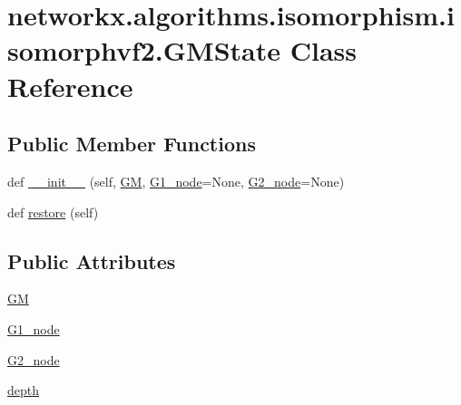 \hypertarget{classnetworkx_1_1algorithms_1_1isomorphism_1_1isomorphvf2_1_1GMState}{}\section{networkx.\+algorithms.\+isomorphism.\+isomorphvf2.\+G\+M\+State Class Reference}
\label{classnetworkx_1_1algorithms_1_1isomorphism_1_1isomorphvf2_1_1GMState}
\subsection*{Public Member Functions}
\begin{DoxyCompactItemize}
\item 
def \hyperlink{classnetworkx_1_1algorithms_1_1isomorphism_1_1isomorphvf2_1_1GMState_ac017518ec50f589c26e6937958702e3b}{\+\_\+\+\_\+init\+\_\+\+\_\+} (self, \hyperlink{classnetworkx_1_1algorithms_1_1isomorphism_1_1isomorphvf2_1_1GMState_ac2fd070bab70da3a84116232e2df57b0}{GM}, \hyperlink{classnetworkx_1_1algorithms_1_1isomorphism_1_1isomorphvf2_1_1GMState_af05bc658c5dc972849dd097568f8d4ec}{G1\+\_\+node}=None, \hyperlink{classnetworkx_1_1algorithms_1_1isomorphism_1_1isomorphvf2_1_1GMState_abe49d09ea5600e34acd1442061c3c211}{G2\+\_\+node}=None)
\item 
def \hyperlink{classnetworkx_1_1algorithms_1_1isomorphism_1_1isomorphvf2_1_1GMState_aa37d621b7a8e928174e9e7f00f10186b}{restore} (self)
\end{DoxyCompactItemize}
\subsection*{Public Attributes}
\begin{DoxyCompactItemize}
\item 
\hyperlink{classnetworkx_1_1algorithms_1_1isomorphism_1_1isomorphvf2_1_1GMState_ac2fd070bab70da3a84116232e2df57b0}{GM}
\item 
\hyperlink{classnetworkx_1_1algorithms_1_1isomorphism_1_1isomorphvf2_1_1GMState_af05bc658c5dc972849dd097568f8d4ec}{G1\+\_\+node}
\item 
\hyperlink{classnetworkx_1_1algorithms_1_1isomorphism_1_1isomorphvf2_1_1GMState_abe49d09ea5600e34acd1442061c3c211}{G2\+\_\+node}
\item 
\hyperlink{classnetworkx_1_1algorithms_1_1isomorphism_1_1isomorphvf2_1_1GMState_a8996f598119f57ac53c73dc0dc5b9fe2}{depth}
\end{DoxyCompactItemize}


